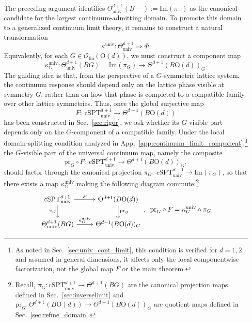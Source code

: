 \documentclass[aps,prx,reprint,superscriptaddress,twocolumn,amsmath,amssymb,amsfonts, nofootinbib]{revtex4-2}
\newcommand{\csptu}{\mathrm{cSPT}^{d+1}_{\mathrm{univ}}}
\newcommand{\ofin}{\mathcal{O}_{\text{fin}}}
\theoremstyle{apsstyle}
\begin{document}
The preceding argument identifies $\Theta^{d+1}_{\mathrm{univ}}(B-):=\mathrm{Im}(\pi_-)$ as the canonical candidate for the largest continuum-admitting domain. To promote this domain to a generalized continuum limit theory, it remains to construct a natural transformation
\begin{equation*}
\kappa^{\mathrm{univ}}: \Theta^{d+1}_{\mathrm{univ}} \Longrightarrow \Phi.
\end{equation*}
Equivalently, for each $G\in\ofin(\mathrm{O}(d))$, we must construct a component map
\begin{equation*}
\kappa^{\mathrm{univ}}_{G}:
\Theta^{d+1}_{\mathrm{univ}}(BG)
=
\mathrm{Im}(\pi_G)
\longrightarrow
\Theta^{d+1}(B\mathrm{O}(d))_{G}.
\end{equation*}
The guiding idea is that, from the perspective of a $G$-symmetric lattice system, the continuum response should depend only on the lattice phase visible at symmetry $G$, rather than on how that phase is completed to a compatible family over other lattice symmetries. Thus, once the global surjective map
\begin{equation*}
    F:\ \mathrm{cSPT}^{d+1}_{\mathrm{univ}}
    \longrightarrow
    \Theta^{d+1}(B\mathrm{O}(d))
\end{equation*}
has been constructed in Sec.~\ref{sec:rigor}, we ask whether its $G$-visible part depends only on the $G$-component of a compatible family. Under the local domain-splitting condition analyzed in App.~\ref{app:continuum_limit_component},\footnote{As noted in Sec.~\ref{sec:univ_cont_limit}, this condition is verified for $d=1,2$ and assumed in general dimensions, it affects only the local componentwise factorization, not the global map $F$ or the main theorem.} the $G$-visible part of the universal continuum map, namely the composite 
\begin{equation*}
    \mathrm{pr}_G\circ F:\ \mathrm{cSPT}^{d+1}_{\mathrm{univ}}
\longrightarrow \Theta^{d+1}(B\mathrm{O}(d))_{G},
\end{equation*}
should factor through the canonical projection $\pi_G:\ \mathrm{cSPT}^{d+1}_{\mathrm{univ}}\to \mathrm{Im}(\pi_G)$, so that there exists a map
$\kappa_G^{\mathrm{univ}}$ making the following diagram commute:\footnote{Recall, $\pi_{G}: \csptu \to \Theta^{d+1}(BG)$ are the canonical projection maps defined in Sec.~\ref{sec:inverselimit} and $\mathrm{pr}_{G}: \Theta^{d+1}(B\mathrm{O}(d))\to \Theta^{d+1}(B\mathrm{O}(d))_{G}$ are quotient maps defined in Sec.~\ref{sec:refine_domain}.} 
\begin{equation}
\begin{tikzcd}
\csptu \arrow[r, "F"] \arrow[d, "\pi_{G}"'] &
\Theta^{d+1}(B\mathrm{O}(d))  \arrow[d, "\mathrm{pr}_G"]\\
\Theta^{d+1}_{\mathrm{univ}}(BG) \arrow[r, "\kappa_{G}^{\mathrm{univ}}"] &
\Theta^{d+1}(B\mathrm{O}(d))_{G}
\end{tikzcd},\;\; \mathrm{pr}_G\circ F=\kappa^{\mathrm{univ}}_{G}\circ \pi_G.
\label{eq:descent}
\end{equation}
\end{document}
